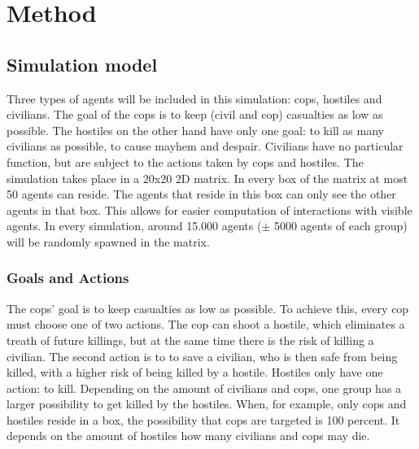 \section{Method}
\subsection{Simulation model}
Three types of agents will be included in this simulation: cops, hostiles and civilians. The goal of the cops is to keep (civil and cop) casualties as low as possible. The hostiles on the other hand have only one goal: to kill as many civilians as possible, to cause mayhem and despair. Civilians have no particular function, but are subject to the actions taken by cops and hostiles. The simulation takes place in a 20x20 2D matrix. In every box of the matrix at most 50 agents can reside. The agents that reside in this box can only see the other agents in that box. This allows for easier computation of interactions with visible agents. In every simulation, around 15.000 agents ($\pm$ 5000 agents of each group) will be randomly spawned in the matrix.  

\subsubsection{Goals and Actions}
The cops' goal is to keep casualties as low as possible. To achieve this, every cop must choose one of two actions. The cop can shoot a hostile, which eliminates a treath of future killings, but at the same time there is the risk of killing a civilian. The second action is to to save a civilian, who is then safe from being killed, with a higher risk of being killed by a hostile. Hostiles only have one action: to kill. Depending on the amount of civilians and cops, one group has a larger possibility to get killed by the hostiles. When, for example, only cops and hostiles reside in a box, the possibility that cops are targeted is 100 percent. It depends on the amount of hostiles how many civilians and cops may die.

